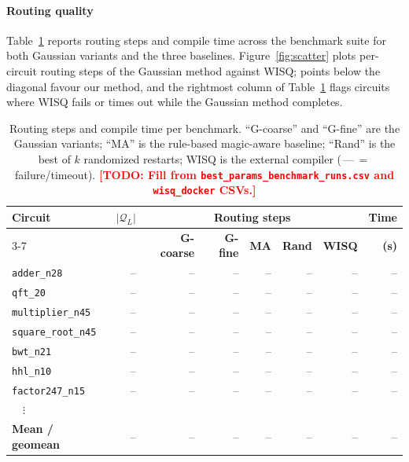 \documentclass[10pt,conference]{IEEEtran}
\theoremstyle{definition}
\theoremstyle{remark}
\newcommand{\Q}{\mathcal{Q}}            %
\newcommand{\todo}[1]{\textcolor{red}{\textbf{[TODO: #1]}}}
\begin{document}
\paragraph{Routing quality}
Table~\ref{tab:results} reports routing steps and compile time across the
benchmark suite for both Gaussian variants and the three baselines.
Figure~\ref{fig:scatter} plots per-circuit routing steps of the Gaussian method
against WISQ; points below the diagonal favour our method, and the rightmost
column of Table~\ref{tab:results} flags circuits where WISQ fails or times out
while the Gaussian method completes.

\begin{table}[t]
    \centering
    \caption{Routing steps and compile time per benchmark. ``G-coarse'' and
    ``G-fine'' are the Gaussian variants; ``MA'' is the rule-based magic-aware
    baseline; ``Rand'' is the best of $k$ randomized restarts; WISQ is the
    external compiler (\,---\,$=$ failure/timeout).
    \todo{Fill from \texttt{best\_params\_benchmark\_runs.csv} and
    \texttt{wisq\_docker} CSVs.}}
    \label{tab:results}
    \setlength{\tabcolsep}{4pt}
    \footnotesize
    \begin{tabular}{l r rrrrr r}
        \toprule
        \textbf{Circuit} & \textbf{$|\Q_L|$}
            & \multicolumn{5}{c}{\textbf{Routing steps}}
            & \textbf{Time} \\
        \cmidrule(lr){3-7}
            & & \textbf{G-coarse} & \textbf{G-fine} & \textbf{MA} & \textbf{Rand} & \textbf{WISQ}
            & \textbf{(s)} \\
        \midrule
        \texttt{adder\_n28}        & -- & -- & -- & -- & -- & -- & -- \\
        \texttt{qft\_20}           & -- & -- & -- & -- & -- & -- & -- \\
        \texttt{multiplier\_n45}   & -- & -- & -- & -- & -- & -- & -- \\
        \texttt{square\_root\_n45} & -- & -- & -- & -- & -- & -- & -- \\
        \texttt{bwt\_n21}          & -- & -- & -- & -- & -- & -- & -- \\
        \texttt{hhl\_n10}          & -- & -- & -- & -- & -- & -- & -- \\
        \texttt{factor247\_n15}    & -- & -- & -- & -- & -- & -- & -- \\
        ~~$\vdots$                 &    &    &    &    &    &    &    \\
        \midrule
        \textbf{Mean / geomean}    & -- & -- & -- & -- & -- & -- & -- \\
        \bottomrule
    \end{tabular}
\end{table}
\end{document}
